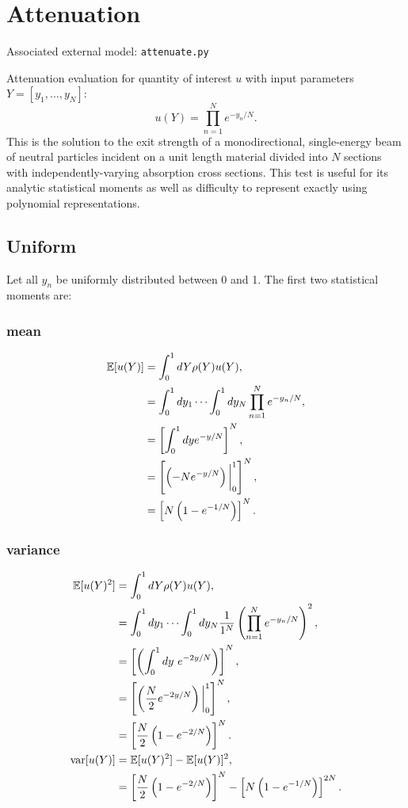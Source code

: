\section{Attenuation}
Associated external model: \texttt{attenuate.py}

Attenuation evaluation for quantity of interest $u$ with input parameters $Y=[y_1,\ldots,y_N]$:
\begin{equation}
u(Y) = \prod_{n=1}^N e^{-y_n/N}.
\end{equation}
This is the solution to the exit strength of a monodirectional, single-energy beam of neutral particles
incident on a unit length material divided into $N$ sections with independently-varying absorption cross
sections.  This test is useful for its analytic statistical moments as well as difficulty to represent
exactly using polynomial representations.

\subsection{Uniform}
Let all $y_n$ be uniformly distributed between 0 and 1.  The first two statistical moments are:
\subsubsection{mean}
\begin{align}
\mathbb{E}[ u(Y)] &=\int_{0}^1 dY \rho(Y)u(Y),\notag \\
  &=\int_{0}^1 dy_1\cdots\int_{0}^1 dy_N \prod_{n=1}^N e^{-y_n/N},\notag \\
  &=\left[ \int_{0}^1 dy e^{-y/N}\right]^N,\\
  &=\left[\left(-Ne^{-y/N}\right)\bigg|_0^1\right]^N,\notag \\
  &=\left[N\left(1-e^{-1/N}\right)\right]^N. \notag
\end{align}
\subsubsection{variance}
\begin{align}
\mathbb{E}[ u(Y)^2] &= \int_{0}^1 dY \rho(Y)u(Y), \notag \\
  &=\int_{0}^1 dy_1\cdots\int_{0}^1 dy_N \frac{1}{1^N} \left(\prod_{n=1}^N e^{-y_n/N}\right)^2,\notag \\
  &=\left[\left(\int_{0}^1 dy\ e^{-2y/N} \right)\right]^N,\notag \\
  &=\left[\left(\frac{N}{2}e^{-2y/N} \right)\bigg|_{0}^1 \right]^N, \\
  &=\left[\frac{N}{2}\left(1-e^{-2/N}\right)\right]^N.\notag \\
\text{var}[u(Y)] &= \mathbb{E}[ u(Y)^2]-\mathbb{E}[ u(Y)]^2, \notag \\
  &= \left[\frac{N}{2}\left(1-e^{-2/N}\right)\right]^N - \left[N\left(1-e^{-1/N}\right)\right]^{2N}.
\end{align}
